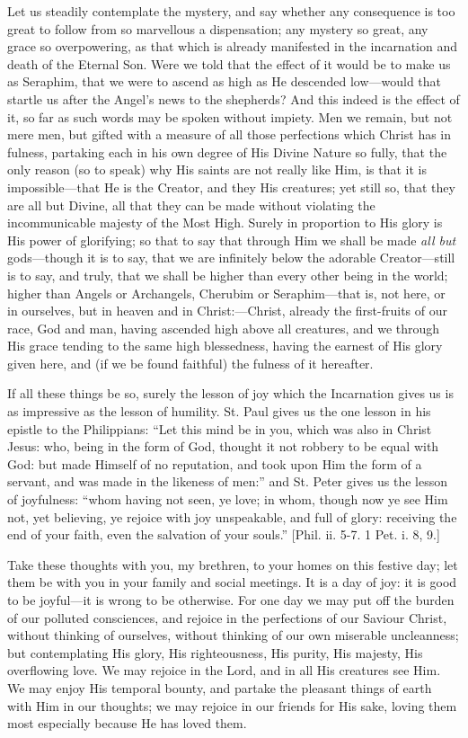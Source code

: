 Let us steadily contemplate the mystery, and say whether any
consequence is too great to follow from so marvellous a dispensation;
any mystery so great, any grace so overpowering, as that which is
already manifested in the incarnation and death of the Eternal Son.
Were we told that the effect of it would be to make us as Seraphim,
that we were to ascend as high as He descended low—would that
startle us after the Angel's news to the shepherds? And this indeed is
the effect of it, so far as such words may be spoken without impiety.
Men we remain, but not mere men, but gifted with a measure of all
those perfections which Christ has in fulness, partaking each in his
own degree of His Divine Nature so fully, that the only reason (so to
speak) why His saints are not really like Him, is that it is
impossible—that He is the Creator, and they His creatures; yet still
so, that they are all but Divine, all that they can be made without
violating the incommunicable majesty of the Most High. Surely in
proportion to His glory is His power of glorifying; so that to say
that through Him we shall be made \emph{all but} gods—though it is
to say, that we are infinitely below the adorable Creator—still is
to say, and truly, that we shall be higher than every other being in
the world; higher than Angels or Archangels, Cherubim or Seraphim—that
is, not here, or in ourselves, but in heaven and in Christ:—Christ,
already the first-fruits of our race, God and man, having ascended
high above all creatures, and we through His grace tending to the same
high blessedness, having the earnest of His glory given here, and (if
we be found faithful) the fulness of it hereafter.

If all these things be so, surely the lesson of joy which the
Incarnation gives us is as impressive as the lesson of humility. St.
Paul gives us the one lesson in his epistle to the Philippians:
``Let this mind be in you, which was also in Christ Jesus: who,
being in the form of God, thought it not robbery to be equal with God:
but made Himself of no reputation, and took upon Him the form of a
servant, and was made in the likeness of men:'' and St. Peter gives us the lesson of joyfulness:
``whom having not seen, ye love; in whom, though now ye see Him
not, yet believing, ye rejoice with joy unspeakable, and full of
glory: receiving the end of your faith, even the salvation of your
souls.'' [Phil. ii. 5-7. 1
Pet. i. 8, 9.]

Take these thoughts with you, my brethren, to your homes on this
festive day; let them be with you in your family and social meetings.
It is a day of joy: it is good to be joyful—it is wrong to be
otherwise. For one day we may put off the burden of our polluted
consciences, and rejoice in the perfections of our Saviour Christ,
without thinking of ourselves, without thinking of our own miserable
uncleanness; but contemplating His glory, His righteousness, His
purity, His majesty, His overflowing love. We may rejoice in the Lord,
and in all His creatures see Him. We may enjoy His temporal bounty,
and partake the pleasant things of earth with Him in our thoughts; we
may rejoice in our friends for His sake, loving them most especially
because He has loved them.

